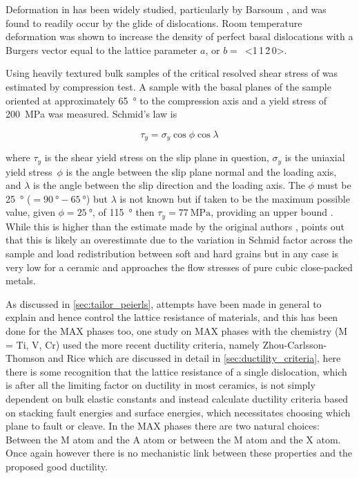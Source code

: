 Deformation in  has been widely studied, particularly by Barsoum \cite{Farber1998,Barsoum1999,Farber1999,Barsoum1999dislocs_kinkbands,Barsoum2001}, and was found to readily occur by the glide of dislocations. Room temperature deformation was shown to increase the density of perfect basal dislocations with a Burgers vector equal to the lattice parameter $a$, or $b =$~<1\,1\,\={2}\,0>. 

Using heavily textured bulk samples of  the critical resolved shear stress of  was estimated by compression test. A sample with the basal planes of the sample oriented at approximately \SI{65}{\degree} to the compression axis and a yield stress of \SI{200}{\mega\pascal} was measured. Schmid's law is 

\begin{equation}
\tau_y = \sigma_y \cos{\phi} \cos{\lambda}
\end{equation}

where $\tau_y$ is the shear yield stress on the slip plane in question, $\sigma_y$ is the uniaxial yield stress\ $\phi$ is the angle between the slip plane normal and the loading axis, and $\lambda$ is the angle between the slip direction and the loading axis. The $\phi$ must be \SI{25}{\degree} ($=\SI{90}{\degree} - \SI{65}{\degree}$) but $\lambda$ is not known but if taken to be the maximum possible value, given $\phi=\SI{25}{\degree}$, of \SI{115}{\degree} then $\tau_y = \SI{77}{\mega\pascal}$, providing an upper bound \cite{Humphrey2012}. While this is higher than the estimate made by the original authors \cite{Barsoum1999}, \citet{Humphrey2012} points out that this is likely an overestimate due to the variation in Schmid factor across the sample and load redistribution between soft and hard grains but in any case is very low for a ceramic and approaches the flow stresses of pure cubic close-packed metals.


%
%
%
%
%
%
%
%
%
%
%
%


As discussed in \autoref{sec:tailor_peierls}, attempts have been made in general to explain and hence control the lattice resistance of materials, and this has been done for the MAX phases too, one study on MAX phases \cite{Music2007ductility} with the chemistry  (M = Ti, V, Cr) used the more recent ductility criteria, namely Zhou-Carlsson-Thomson \cite{Zhou1994} and Rice \cite{Rice1992} which are discussed in detail in \autoref{sec:ductility_criteria}, here there is some recognition that the lattice resistance of a single dislocation, which is after all the limiting factor on ductility in most ceramics, is not simply dependent on bulk elastic constants and instead calculate ductility criteria based on stacking fault energies and surface energies, which necessitates choosing which plane to fault or cleave. In the MAX phases there are two natural choices: Between the M atom and the A atom or between the M atom and the X atom. Once again however there is no mechanistic link between these properties and the proposed good ductility. 

